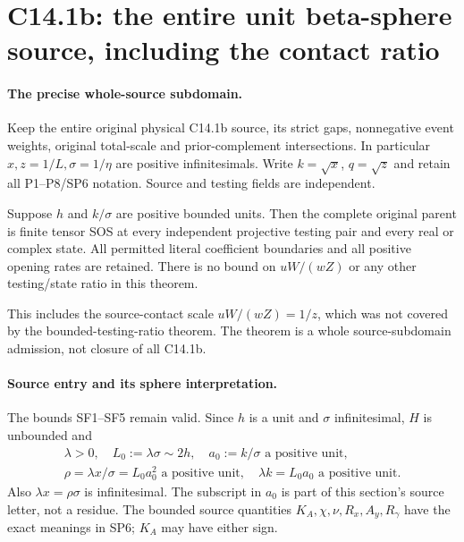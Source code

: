 \section{C14.1b: the entire unit beta-sphere source, including the contact ratio}
\label{sec:c141b-unit-beta-sphere}

\paragraph{The precise whole-source subdomain.}
Keep the entire original physical C14.1b source, its strict gaps,
nonnegative event weights, original total-scale and prior-complement
intersections. In particular $x,z=1/L,\sigma=1/\eta$ are positive
infinitesimals. Write $k=\sqrt x$, $q=\sqrt z$ and retain all
P1--P8/SP6 notation. Source and testing fields are independent.

\begin{theorem}
Suppose $h$ and $k/\sigma$ are positive bounded units. Then the
complete original parent is finite tensor SOS at every independent
projective testing pair and every real or complex state. All permitted
literal coefficient boundaries and all positive opening rates are
retained. There is no bound on $uW/(wZ)$ or any other testing/state
ratio in this theorem.
\end{theorem}

This includes the source-contact scale $uW/(wZ)=1/z$, which was not
covered by the bounded-testing-ratio theorem. The theorem is a whole
source-subdomain admission, not closure of all C14.1b.

\paragraph{Source entry and its sphere interpretation.}
The bounds SF1--SF5 remain valid. Since $h$ is a unit and
$\sigma$ infinitesimal, $H$ is unbounded and
\[
 \begin{gathered}
 \lambda>0,\quad L_0:=\lambda\sigma\sim2h,\quad
 a_0:=k/\sigma\text{ a positive unit},\\
 \rho=\lambda x/\sigma=L_0a_0^2\text{ a positive unit},
 \quad \lambda k=L_0a_0\text{ a positive unit}.
 \end{gathered}
 \tag{US1}
\]
Also $\lambda x=\rho\sigma$ is infinitesimal. The subscript in
$a_0$ is part of this section's source letter, not a residue.
The bounded source quantities $K_A,\chi,\nu,R_x,A_y,R_\gamma$
have the exact meanings in SP6; $K_A$ may have either sign.


